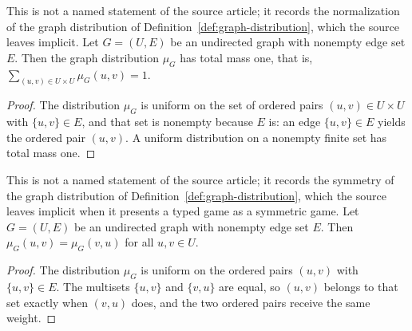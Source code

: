 \begin{lemma}\label{lem:graph-distribution-mass}
	\leanok
	This is not a named statement of the source article; it records the normalization of the graph distribution of Definition~\ref{def:graph-distribution}, which the source leaves implicit. Let $G = (U, E)$ be an undirected graph with nonempty edge set $E$. Then the graph distribution $\mu_G$ has total mass one, that is, $\sum_{(u,v) \in U \times U} \mu_G(u,v) = 1$.
\end{lemma}
\begin{proof}
	\leanok
	The distribution $\mu_G$ is uniform on the set of ordered pairs $(u,v) \in U \times U$ with $\{u,v\} \in E$, and that set is nonempty because $E$ is: an edge $\{u,v\} \in E$ yields the ordered pair $(u,v)$. A uniform distribution on a nonempty finite set has total mass one.
\end{proof}

\begin{lemma}\label{lem:graph-distribution-symm}
	\leanok
	This is not a named statement of the source article; it records the symmetry of the graph distribution of Definition~\ref{def:graph-distribution}, which the source leaves implicit when it presents a typed game as a symmetric game. Let $G = (U, E)$ be an undirected graph with nonempty edge set $E$. Then $\mu_G(u,v) = \mu_G(v,u)$ for all $u, v \in U$.
\end{lemma}
\begin{proof}
	\leanok
	The distribution $\mu_G$ is uniform on the ordered pairs $(u,v)$ with $\{u,v\} \in E$. The multisets $\{u,v\}$ and $\{v,u\}$ are equal, so $(u,v)$ belongs to that set exactly when $(v,u)$ does, and the two ordered pairs receive the same weight.
\end{proof}


